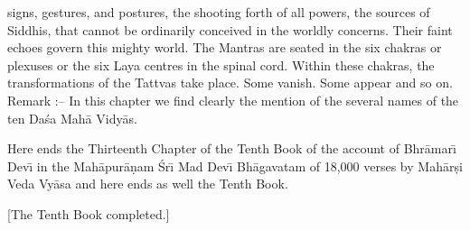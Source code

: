 signs, gestures, and postures, the shooting forth of all powers, the sources of Siddhis, that cannot be ordinarily conceived in the worldly concerns. Their faint echoes govern this mighty world. The Mantras are seated in the six chakras or plexuses or the six Laya centres in the spinal cord. Within these chakras, the transformations of the Tattvas take place. Some vanish. Some appear and so on. Remark :-- In this chapter we find clearly the mention of the several names of the ten Da\'sa Mah\=a Vidy\=as.

Here ends the Thirteenth Chapter of the Tenth Book of the account of Bhr\=amar\={\i} Dev\={\i} in the Mah\=apur\=a\d{n}am \'Sr\={\i} Mad Dev\={\i} Bh\=agavatam of 18,000 verses by Mah\=ar\d{s}i Veda Vy\=asa and here ends as well the Tenth Book.

[The Tenth Book completed.]




